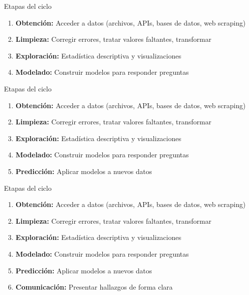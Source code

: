 \documentclass{beamer}
\begin{document}
\begin{frame}{Etapas del ciclo}
\begin{enumerate}
    \item \textbf{Obtención:} Acceder a datos (archivos, APIs, bases de datos, web scraping)
    \item \textbf{Limpieza:} Corregir errores, tratar valores faltantes, transformar
    \item \textbf{Exploración:} Estadística descriptiva y visualizaciones
    \item \textbf{Modelado:} Construir modelos para responder preguntas
\end{enumerate}
\end{frame}

\begin{frame}{Etapas del ciclo}
\begin{enumerate}
    \item \textbf{Obtención:} Acceder a datos (archivos, APIs, bases de datos, web scraping)
    \item \textbf{Limpieza:} Corregir errores, tratar valores faltantes, transformar
    \item \textbf{Exploración:} Estadística descriptiva y visualizaciones
    \item \textbf{Modelado:} Construir modelos para responder preguntas
    \item \textbf{Predicción:} Aplicar modelos a nuevos datos
\end{enumerate}
\end{frame}

\begin{frame}{Etapas del ciclo}
\begin{enumerate}
    \item \textbf{Obtención:} Acceder a datos (archivos, APIs, bases de datos, web scraping)
    \item \textbf{Limpieza:} Corregir errores, tratar valores faltantes, transformar
    \item \textbf{Exploración:} Estadística descriptiva y visualizaciones
    \item \textbf{Modelado:} Construir modelos para responder preguntas
    \item \textbf{Predicción:} Aplicar modelos a nuevos datos
    \item \textbf{Comunicación:} Presentar hallazgos de forma clara
\end{enumerate}
\end{frame}
\end{document}
